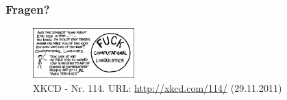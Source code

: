 \documentclass{clsemhs11-beamer}
\begin{document}
\begin{frame}
  \frametitle{Fragen?}
  \begin{figure}
  \includegraphics[width=0.35\textwidth]{graphics/xkcd--cl}
  \caption{XKCD - Nr. 114. URL: \url{http://xkcd.com/114/} (29.11.2011)}
  \end{figure}
\end{frame}
\end{document}
